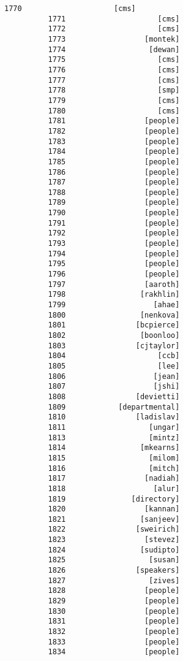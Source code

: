 \documentclass[11pt]{article}
\begin{document}
\begin{Verbatim}[commandchars=\\\{\}]
          1770                     [cms]
          1771                     [cms]
          1772                     [cms]
          1773                  [montek]
          1774                   [dewan]
          1775                     [cms]
          1776                     [cms]
          1777                     [cms]
          1778                     [smp]
          1779                     [cms]
          1780                     [cms]
          1781                  [people]
          1782                  [people]
          1783                  [people]
          1784                  [people]
          1785                  [people]
          1786                  [people]
          1787                  [people]
          1788                  [people]
          1789                  [people]
          1790                  [people]
          1791                  [people]
          1792                  [people]
          1793                  [people]
          1794                  [people]
          1795                  [people]
          1796                  [people]
          1797                  [aaroth]
          1798                 [rakhlin]
          1799                    [ahae]
          1800                 [nenkova]
          1801                [bcpierce]
          1802                 [boonloo]
          1803                [cjtaylor]
          1804                     [ccb]
          1805                     [lee]
          1806                    [jean]
          1807                    [jshi]
          1808                [devietti]
          1809            [departmental]
          1810                [ladislav]
          1811                   [ungar]
          1813                   [mintz]
          1814                 [mkearns]
          1815                   [milom]
          1816                   [mitch]
          1817                  [nadiah]
          1818                    [alur]
          1819               [directory]
          1820                  [kannan]
          1821                 [sanjeev]
          1822                [sweirich]
          1823                  [stevez]
          1824                 [sudipto]
          1825                   [susan]
          1826                [speakers]
          1827                   [zives]
          1828                  [people]
          1829                  [people]
          1830                  [people]
          1831                  [people]
          1832                  [people]
          1833                  [people]
          1834                  [people]

\end{Verbatim}
\end{document}
